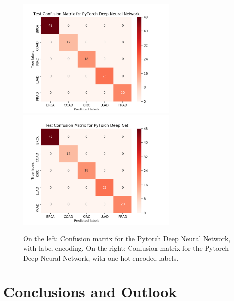 \documentclass{article}
\begin{document}
\begin{itemize}
\begin{figure}[hbt]
\centering
\advance\leftskip-4cm
\advance\rightskip-4cm
\includegraphics[width=0.7\textwidth]{img/matrix_py_enc}
\includegraphics[width=0.7\textwidth]{img/matrix_py_hot}
\caption{On the left: Confusion matrix for the Pytorch Deep Neural Network, with label encoding. On the right: Confusion matrix for the Pytorch Deep Neural Network, with one-hot encoded labels.}
\label{fig_torch}
\end{figure}


\end{itemize}





\section{Conclusions and Outlook}









\end{document}
